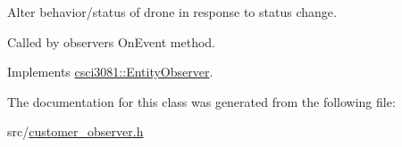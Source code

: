 Alter behavior/status of drone in response to status change. 

Called by observer\textquotesingle{}s On\+Event method. 

Implements \hyperlink{classcsci3081_1_1EntityObserver_ad3188f03b6e68961ffcc415526795867}{csci3081\+::\+Entity\+Observer}.



The documentation for this class was generated from the following file\+:\begin{DoxyCompactItemize}
\item 
src/\hyperlink{customer__observer_8h}{customer\+\_\+observer.\+h}\end{DoxyCompactItemize}
